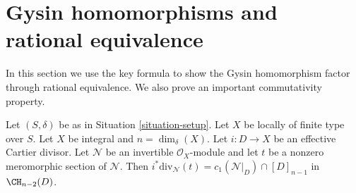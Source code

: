 \section{Gysin homomorphisms and rational equivalence}
\label{section-gysin}

\noindent
In this section we use the key formula to show the Gysin homomorphism
factor through rational equivalence. We also prove an important
commutativity property.

\begin{lemma}
\label{lemma-gysin-factors-general}
Let $(S, \delta)$ be as in Situation \ref{situation-setup}.
Let $X$ be locally of finite type over $S$.
Let $X$ be integral and $n = \dim_\delta(X)$.
Let $i : D \to X$ be an effective Cartier divisor.
Let $\mathcal{N}$ be an invertible $\mathcal{O}_X$-module
and let $t$ be a nonzero meromorphic section of $\mathcal{N}$.
Then $i^*\text{div}_\mathcal{N}(t) = c_1(\mathcal{N}|_D) \cap [D]_{n - 1}$
in $\CH_{n - 2}(D)$.
\end{lemma}

